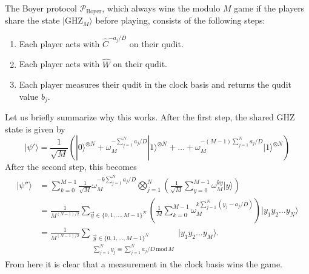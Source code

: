 \documentclass[prb,twocolumn,showpacs,amssymb,superscriptaddress]{revtex4-2}
\begin{document}
The Boyer protocol $\mathcal{P}_{\mathrm{Boyer}}$, which always wins the modulo $M$ game if the players share the state $|\mathrm{GHZ}_M\rangle$ before playing, consists of the following steps:
\begin{enumerate}
    \item Each player acts with $\hat{C}^{-a_j/D}$ on their qudit.
    \item Each player acts with $\hat{W}$ on their qudit.
    \item Each player measures their qudit in the clock basis and returns the qudit value $b_j$.
\end{enumerate}
Let us briefly summarize why this works. After the first step, the shared GHZ state is given by
\begin{equation}
|\psi'\rangle = \frac{1}{\sqrt{M}} \left(|0 \rangle^{\otimes N} + \omega_M^{-\sum_{j=1}^N a_j/D}|1\rangle^{\otimes N} + \ldots + \omega_M^{-(M-1)\sum_{j=1}^N a_j/D}|1\rangle^{\otimes N} \right)
\end{equation}
After the second step, this becomes
\begin{align}
\nonumber |\psi'' \rangle &= \sum_{k=0}^{M-1} \frac{1}{\sqrt{M}} \omega_M^{-k \sum_{j=1}^N a_j/D} \bigotimes_{j=1}^N \left(\frac{1}{\sqrt{M}}  \sum_{y=0}^{M-1} \omega_M^{k y} |y\rangle\right) \\
\nonumber &= \frac{1}{M^{(N-1)/2}}  \sum_{\vec{y} \in \{0,1,\ldots,M-1\}^N} \left(\frac{1}{M} \sum_{k=0}^{M-1} \omega_M^{k \sum_{j=1}^N (y_j-a_j/D)}\right) |y_1y_2\ldots y_N\rangle \\
&=  \frac{1}{M^{(N-1)/2}} \sum_{\substack{\vec{y} \in \{0,1,\ldots,M-1\}^N\\ \sum_{j=1}^N y_j \equiv \sum_{j=1}^N a_j/D \,\mathrm{mod}\,{M}}} |y_1 y_2 \ldots y_M\rangle.
\end{align}
From here it is clear that a measurement in the clock basis wins the game. 
\end{document}
